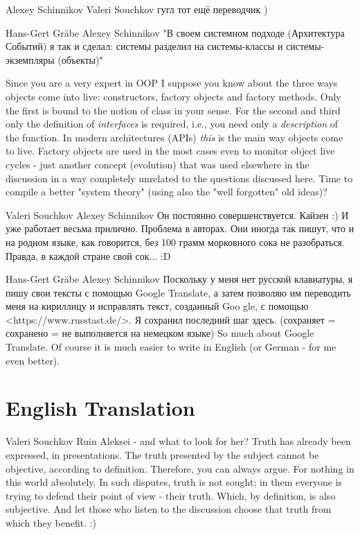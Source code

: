 \documentclass[11pt,a4paper]{article}
\begin{document}
Alexey Schinnikov Valeri Souchkov гугл тот ещё переводчик )

Hans-Gert Gräbe Alexey Schinnikov "В своем системном подходе (Архитектура
Событий) я так и сделал: системы разделил на системы-классы и
системы-экземпляры (объекты)"

Since you are a very expert in OOP I suppose you know about the three ways
objects come into live: constructors, factory objects and factory methods.
Only the first is bound to the notion of class in your sense. For the second
and third only the definition of \emph{interfaces} is required, i.e., you need
only a \emph{description} of the function. In modern architectures (APIs)
\emph{this} is the main way objects come to live. Factory objects are used in
the most cases even to monitor object live cycles - just another concept
(evolution) that was used elsewhere in the discussion in a way completely
unrelated to the questions discussed here. Time to compile a better "system
theory" (using also the "well forgotten" old ideas)?

Valeri Souchkov Alexey Schinnikov Он постоянно совершенствуется. Кайзен :) И
уже работает весьма прилично. Проблема в авторах. Они иногда так пишут, что и
на родном языке, как говорится, без 100 грамм морковного сока не
разобраться. Правда, в каждой стране свой сок... :D 

Hans-Gert Gräbe Alexey Schinnikov Поскольку у меня нет русской клавиатуры, я
пишу свои тексты с помощью Google Translate, а затем позволяю им переводить
меня на кириллицу и исправлять текст, созданный Goo gle, с помощью
<https://www.russtast.de/>. Я сохранил последний шаг здесь. (сохраняет =
сохранено = не выполняется на немецком языке) So much about Google
Translate. Of course it is much easier to write in English (or German - for me
even better).

\section*{English Translation}

Valeri Souchkov Ruin Aleksei - and what to look for her? Truth has already
been expressed, in presentations. The truth presented by the subject cannot be
objective, according to definition. Therefore, you can always argue. For
nothing in this world absolutely. In such disputes, truth is not sought; in
them everyone is trying to defend their point of view - their truth. Which, by
definition, is also subjective. And let those who listen to the discussion
choose that truth from which they benefit. :)
\end{document}
